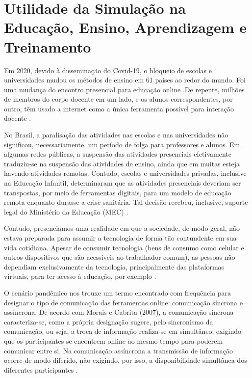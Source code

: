 \section{Utilidade da Simulação na Educação, Ensino, Aprendizagem e Treinamento}


Em 2020, devido à disseminação do Covid-19, o bloqueio de escolas e universidades mudou os métodos de ensino em 61 países ao redor do mundo. Foi uma mudança do encontro presencial para educação online \cite{UNESCO2020:online}.De repente, milhões de membros do corpo docente em um lado, e os alunos correspondentes, por outro, têm usado a internet como a única ferramenta possível para interação docente \cite{BAO2020:online}.

No Brasil, a paralisação das atividades nas escolas e nas universidades não significou, necessariamente, um período de folga para professores e alunos. Em algumas redes públicas, a suspensão das atividades presenciais efetivamente traduziu-se na suspensão das atividades de ensino, ainda que em muitas esteja havendo atividades remotas. Contudo, escolas e universidades privadas, inclusive na Educação Infantil, determinaram que as atividades presenciais deveriam ser transpostas, por meio de ferramentas digitais, para um modelo de educação remota enquanto durasse a crise sanitária. Tal decisão recebeu, inclusive, suporte legal do Ministério da Educação (MEC) \cite{saraiva2020educacao}.

Contudo, presenciamos uma realidade em que a sociedade, de modo geral, não estava preparada para assumir  a  tecnologia  de  forma  tão  contundente  em  sua  vida cotidiana.  Apesar  de  consumir  tecnologia  (bens  de  consumo  como  celular e outros  dispositivos  que  são  acessíveis  ao  trabalhador  comum),  as  pessoas não dependiam exclusivamente da tecnologia, principalmente das plataformas virtuais, para ter acesso à educação, por exemplo \cite{miranda2021formacao}.

O cenário pandêmico nos trouxe um termo encontrado com frequência para designar o tipo de comunicação das ferramentas online: comunicação síncrona e assíncrona. De acordo com Morais e Cabrita (2007), a comunicação síncrona caracteriza-se, como a própria designação sugere, pelo sincronismo da comunicação, ou seja, a troca de informação realiza-se em simultâneo, exigindo que os participantes se encontrem online ao mesmo tempo para poderem comunicar entre si. Na comunicação assíncrona a transmissão de informação ocorre de modo diferido, não exigindo, por isso, a disponibilidade simultânea dos diferentes participantes \cite{morais2007ambientes}.









